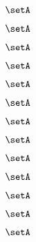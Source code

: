 \begin{forslides}
    \begin{equation}
        \label{eq:slides-translation-27}
        \setA
    \end{equation}

    \begin{equation}
        \label{eq:slides-translation-28}
        \setA
    \end{equation}

    \begin{equation}
        \label{eq:slides-translation-29}
        \setA
    \end{equation}

    \begin{equation}
        \label{eq:slides-translation-30}
        \setA
    \end{equation}

    \begin{equation}
        \label{eq:slides-translation-31}
        \setA
    \end{equation}

    \begin{equation}
        \label{eq:slides-translation-32}
        \setA
    \end{equation}

    \begin{equation}
        \label{eq:slides-translation-33}
        \setA
    \end{equation}

    \begin{equation}
        \label{eq:slides-translation-34}
        \setA
    \end{equation}

    \begin{equation}
        \label{eq:slides-translation-35}
        \setA
    \end{equation}

    \begin{equation}
        \label{eq:slides-translation-36}
        \setA
    \end{equation}

    \begin{equation}
        \label{eq:slides-translation-37}
        \setA
    \end{equation}

    \begin{equation}
        \label{eq:slides-translation-38}
        \setA
    \end{equation}

    \begin{equation}
        \label{eq:slides-translation-39}
        \setA
    \end{equation}


\end{forslides}
